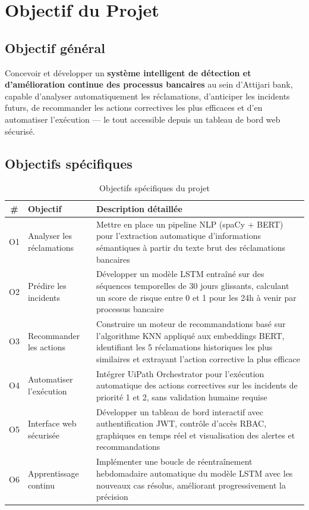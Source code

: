 \documentclass[12pt,a4paper]{report}
\begin{document}
\chapter{Objectif du Projet}

\section{Objectif général}

Concevoir et développer un \textbf{système intelligent de détection et d'amélioration continue des processus bancaires} au sein d'Attijari bank, capable d'analyser automatiquement les réclamations, d'anticiper les incidents futurs, de recommander les actions correctives les plus efficaces et d'en automatiser l'exécution --- le tout accessible depuis un tableau de bord web sécurisé.

\section{Objectifs spécifiques}

\begin{table}[H]
\centering
\caption{Objectifs spécifiques du projet}
\begin{tabularx}{\textwidth}{|c|l|X|}
\hline
\textbf{\#} & \textbf{Objectif} & \textbf{Description détaillée} \\
\hline
O1 & Analyser les réclamations & Mettre en place un pipeline NLP (spaCy + BERT) pour l'extraction automatique d'informations sémantiques à partir du texte brut des réclamations bancaires \\
\hline
O2 & Prédire les incidents & Développer un modèle LSTM entraîné sur des séquences temporelles de 30 jours glissants, calculant un score de risque entre 0 et 1 pour les 24h à venir par processus bancaire \\
\hline
O3 & Recommander les actions & Construire un moteur de recommandations basé sur l'algorithme KNN appliqué aux embeddings BERT, identifiant les 5 réclamations historiques les plus similaires et extrayant l'action corrective la plus efficace \\
\hline
O4 & Automatiser l'exécution & Intégrer UiPath Orchestrator pour l'exécution automatique des actions correctives sur les incidents de priorité 1 et 2, sans validation humaine requise \\
\hline
O5 & Interface web sécurisée & Développer un tableau de bord interactif avec authentification JWT, contrôle d'accès RBAC, graphiques en temps réel et visualisation des alertes et recommandations \\
\hline
O6 & Apprentissage continu & Implémenter une boucle de réentraînement hebdomadaire automatique du modèle LSTM avec les nouveaux cas résolus, améliorant progressivement la précision \\
\hline
\end{tabularx}
\end{table}
\end{document}
